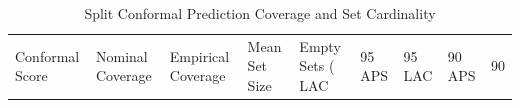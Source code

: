 \begin{table}
\caption{Split Conformal Prediction Coverage and Set Cardinality}
\label{tab:conformal}
\begin{tabular}{llllll}
\toprule
Conformal Score & Nominal Coverage & Empirical Coverage & Mean Set Size & Empty Sets (%
\midrule
LAC & 95%
APS & 95%
LAC & 90%
APS & 90%
\bottomrule
\end{tabular}
\end{table}
